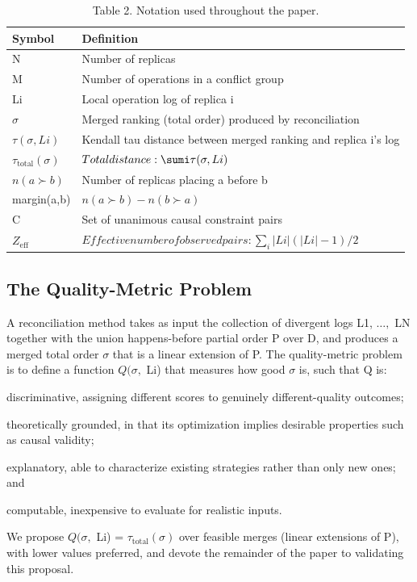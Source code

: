 \documentclass[10pt,twocolumn]{article}
\begin{document}
\begin{table}[t]
\centering
\caption{Table 2. Notation used throughout the paper.}
\begin{tabular}{ll}
\hline
Symbol & Definition \\
\hline
N & Number of replicas \\
M & Number of operations in a conflict group \\
Li & Local operation log of replica i \\
$\sigma$ & Merged ranking (total order) produced by reconciliation \\
$\tau(\sigma, Li)$ & Kendall tau distance between merged ranking and replica i's log \\
$\tau_{\mathrm{total}}(\sigma)$ & $Total distance: \sumi \tau(\sigma, Li)$ \\
$n(a \succ b)$ & Number of replicas placing a before b \\
margin(a,b) & $n(a \succ b) - n(b \succ a)$ \\
C & Set of unanimous causal constraint pairs \\
$Z_{\mathrm{eff}}$ & $Effective number of observed pairs: \sum_{i} |Li|(|Li|-1)/2$ \\
\hline
\end{tabular}
\end{table}

\subsection{The Quality-Metric Problem}
A reconciliation method takes as input the collection of divergent logs {L1, $\ldots,$ LN} together with the union happens-before partial order P over D, and produces a merged total order $\sigma$ that is a linear extension of P. The quality-metric problem is to define a function $Q(\sigma,$ {Li}) that measures how good $\sigma$ is, such that Q is:

discriminative, assigning different scores to genuinely different-quality outcomes;

theoretically grounded, in that its optimization implies desirable properties such as causal validity;

explanatory, able to characterize existing strategies rather than only new ones; and

computable, inexpensive to evaluate for realistic inputs.

We propose $Q(\sigma,$ {Li}) = $\tau_{\mathrm{total}}(\sigma)$ over feasible merges (linear extensions of P), with lower values preferred, and devote the remainder of the paper to validating this proposal.
\end{document}
